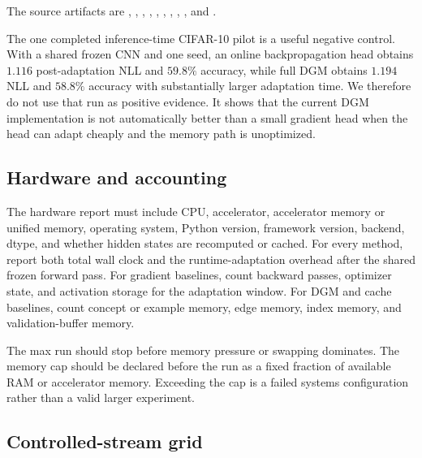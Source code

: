 The source artifacts are
,
,
,
,
,
,
,
,
, and
.

The one completed inference-time CIFAR-10 pilot is a useful negative control.
With a shared frozen CNN and one seed, an online backpropagation head obtains
$1.116$ post-adaptation NLL and $59.8\%$ accuracy, while full DGM obtains
$1.194$ NLL and $58.8\%$ accuracy with substantially larger adaptation time.
We therefore do not use that run as positive evidence. It shows that the
current DGM implementation is not automatically better than a small gradient
head when the head can adapt cheaply and the memory path is unoptimized.

\subsection{Hardware and accounting}

The hardware report must include CPU, accelerator, accelerator memory or unified
memory, operating system, Python version, framework version, backend, dtype, and
whether hidden states are recomputed or cached. For every method, report both
total wall clock and the runtime-adaptation overhead after the shared frozen
forward pass. For gradient baselines, count backward passes, optimizer state,
and activation storage for the adaptation window. For DGM and cache baselines,
count concept or example memory, edge memory, index memory, and
validation-buffer memory.

The max run should stop before memory pressure or swapping dominates. The memory
cap should be declared before the run as a fixed fraction of available RAM or
accelerator memory. Exceeding the cap is a failed systems configuration rather
than a valid larger experiment.

\subsection{Controlled-stream grid}

